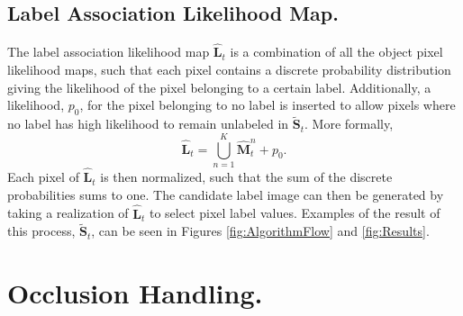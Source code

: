 \subsection{Label Association Likelihood Map.}
\label{sec:LabelAssocLikelihoodMap}
The label association likelihood map $\mathbf{\hat{L}}_{t}$ is a combination of all the object pixel likelihood maps, such that each pixel contains a discrete probability distribution giving the likelihood of the pixel belonging to a certain label.  Additionally, a likelihood, $p_0$, for the pixel belonging to no label is inserted to allow pixels where no label has high likelihood to remain unlabeled in  $\tilde{\mathbf{S}}_{t}$. More formally, 
\begin{equation}
\mathbf{\hat{L}}_{t} = \bigcup_{n=1}^{K} \mathbf{\hat{M}}^{n}_{t} + p_0. 
\label{eqn:LabelMap}
\end{equation}
Each pixel of $\mathbf{\hat{L}}_{t}$ is then normalized, such that the sum of the discrete probabilities sums to one. The candidate label image can then be generated by taking a realization of $\mathbf{\hat{L}}_{t}$ to select pixel label values. Examples of the result of this process, $\tilde{\mathbf{S}}_{t}$, can be seen in Figures \ref{fig:AlgorithmFlow} and \ref{fig:Results}.

\section{Occlusion Handling.}
